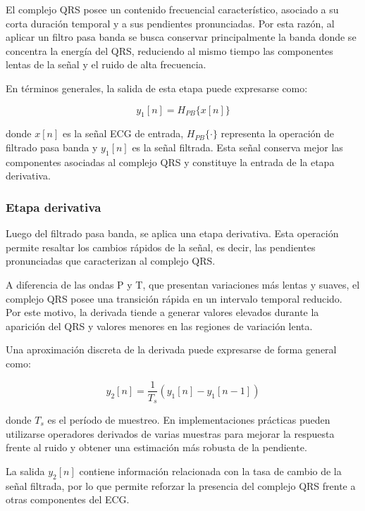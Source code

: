 \documentclass[12pt]{article}
\begin{document}
				El complejo QRS posee un contenido frecuencial característico, asociado a su corta duración temporal y a sus pendientes pronunciadas. Por esta razón, al aplicar un filtro pasa banda se busca conservar principalmente la banda donde se concentra la energía del QRS, reduciendo al mismo tiempo las componentes lentas de la señal y el ruido de alta frecuencia.

				En términos generales, la salida de esta etapa puede expresarse como:

				\begin{equation}
					y_1[n] = H_{PB}\{x[n]\}
				\end{equation}

				donde $x[n]$ es la señal ECG de entrada, $H_{PB}\{\cdot\}$ representa la operación de filtrado pasa banda y $y_1[n]$ es la señal filtrada. Esta señal conserva mejor las componentes asociadas al complejo QRS y constituye la entrada de la etapa derivativa.

				\subsubsection{Etapa derivativa}

				Luego del filtrado pasa banda, se aplica una etapa derivativa. Esta operación permite resaltar los cambios rápidos de la señal, es decir, las pendientes pronunciadas que caracterizan al complejo QRS.

				A diferencia de las ondas P y T, que presentan variaciones más lentas y suaves, el complejo QRS posee una transición rápida en un intervalo temporal reducido. Por este motivo, la derivada tiende a generar valores elevados durante la aparición del QRS y valores menores en las regiones de variación lenta.

				Una aproximación discreta de la derivada puede expresarse de forma general como:

				\begin{equation}
					y_2[n] = \frac{1}{T_s}\left(y_1[n] - y_1[n-1]\right)
				\end{equation}

				donde $T_s$ es el período de muestreo. En implementaciones prácticas pueden utilizarse operadores derivados de varias muestras para mejorar la respuesta frente al ruido y obtener una estimación más robusta de la pendiente.

				La salida $y_2[n]$ contiene información relacionada con la tasa de cambio de la señal filtrada, por lo que permite reforzar la presencia del complejo QRS frente a otras componentes del ECG.
\end{document}
